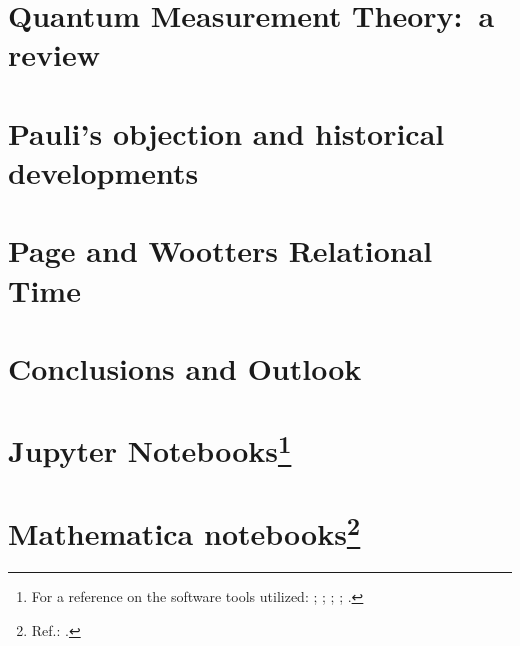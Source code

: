 \chapter{Quantum Measurement Theory:~a review}\label{ch:decohere}





%



\chapter{Pauli's objection and historical developments}\label{ch:hist}



%


\chapter{Page and Wootters Relational Time}\label{ch:pw}\label{ch:detect}








\chapter{Conclusions and Outlook}\label{ch:outlook}




\appendix

\chapter[Jupyter Notebooks]{Jupyter Notebooks\footnote{
  For a reference on the software tools utilized:
  \cite{comp:scipy};
  \cite{comp:sympy};
  \cite{comp:jupyter};
  \cite{comp:matplotlib};
  \cite{comp:numpy}.
}}

% 
% 



\chapter[Mathematica notebooks]{Mathematica notebooks\footnote{
  Ref.: \cite{Wolfram}.
}}



\printbibliography[heading=bibintoc]


